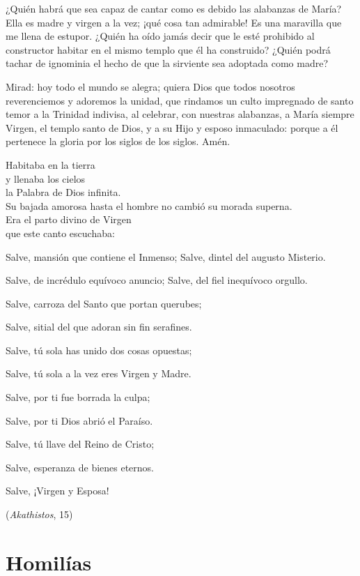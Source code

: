 \begin{body}
	¿Quién habrá que sea capaz de cantar como es debido las alabanzas de María? Ella es madre y virgen a la vez; ¡qué cosa tan admirable! Es una maravilla que me llena de estupor. ¿Quién ha oído jamás decir que le esté prohibido al constructor habitar en el mismo templo que él ha construido? ¿Quién podrá tachar de ignominia el hecho de que la sirviente sea adoptada como madre?
	
	Mirad: hoy todo el mundo se alegra; quiera Dios que todos nosotros reverenciemos y adoremos la unidad, que rindamos un culto impregnado de santo temor a la Trinidad indivisa, al celebrar, con nuestras alabanzas, a María siempre Virgen, el templo santo de Dios, y a su Hijo y esposo inmaculado: porque a él pertenece la gloria por los siglos de los siglos. Amén.
\end{body}

\begin{patercite}
	Habitaba en la tierra \\y llenaba los cielos \\la Palabra de Dios infinita. \\Su bajada amorosa hasta el hombre no cambió su morada superna. \\Era el parto divino de Virgen\\ que este canto escuchaba:
	
	Salve, mansión que contiene el Inmenso; Salve, dintel del augusto Misterio.
	
	Salve, de incrédulo equívoco anuncio; Salve, del fiel inequívoco orgullo.
	
	Salve, carroza del Santo que portan querubes;
	
	Salve, sitial del que adoran sin fin serafines.
	
	Salve, tú sola has unido dos cosas opuestas;
	
	Salve, tú sola a la vez eres Virgen y Madre.
	
	Salve, por ti fue borrada la culpa;
	
	Salve, por ti Dios abrió el Paraíso.
	
	Salve, tú llave del Reino de Cristo;
	
	Salve, esperanza de bienes eternos.
	
	Salve, ¡Virgen y Esposa!
	
	(\emph{Akathistos}, 15)\cite{Akathistos015}
\end{patercite}


\newsection


\section{Homilías}

